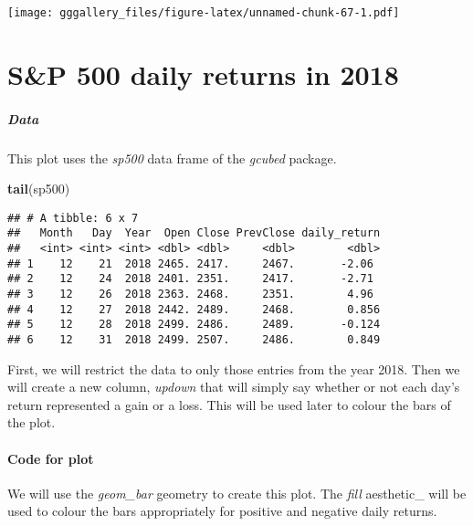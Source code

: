 \documentclass[]{book}
\newenvironment{Shaded}{\begin{snugshade}}{\end{snugshade}}
\newcommand{\KeywordTok}[1]{\textcolor[rgb]{0.13,0.29,0.53}{\textbf{#1}}}
\newcommand{\NormalTok}[1]{#1}
\let\oldparagraph\paragraph
\renewcommand{\paragraph}[1]{\oldparagraph{#1}\mbox{}}
\begin{document}
\texttt{[image: gggallery\_files/figure-latex/unnamed-chunk-67-1.pdf]}

\hypertarget{sp}{%
\chapter*{S\&P 500 daily returns in 2018}\label{sp}}

\hypertarget{spdata}{%
\paragraph{Data}\label{spdata}}

This plot uses the \emph{sp500} data frame of the \emph{gcubed} package.

\begin{Shaded}
\begin{Highlighting}[]
\KeywordTok{tail}\NormalTok{(sp500)}
\end{Highlighting}
\end{Shaded}

\begin{verbatim}
## # A tibble: 6 x 7
##   Month   Day  Year  Open Close PrevClose daily_return
##   <int> <int> <int> <dbl> <dbl>     <dbl>        <dbl>
## 1    12    21  2018 2465. 2417.     2467.       -2.06 
## 2    12    24  2018 2401. 2351.     2417.       -2.71 
## 3    12    26  2018 2363. 2468.     2351.        4.96 
## 4    12    27  2018 2442. 2489.     2468.        0.856
## 5    12    28  2018 2499. 2486.     2489.       -0.124
## 6    12    31  2018 2499. 2507.     2486.        0.849
\end{verbatim}

First, we will restrict the data to only those entries from the year 2018. Then we will create a new column, \emph{updown} that will simply say whether or not each day's return represented a gain or a loss. This will be used later to colour the bars of the plot.

\hypertarget{spcode}{%
\subsubsection*{Code for plot}\label{spcode}}

We will use the \emph{geom\_bar} geometry to create this plot. The \emph{fill} aesthetic\_ will be used to colour the bars appropriately for positive and negative daily returns.
\end{document}
